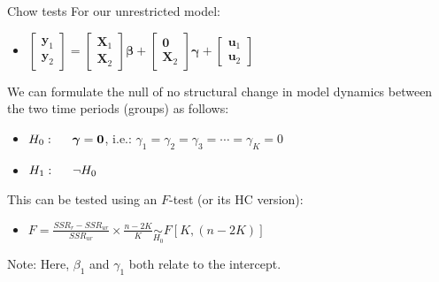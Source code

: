 \documentclass{beamer}
\begin{document}
\begin{frame}{Chow tests}
For  our unrestricted model:\\
\medskip
\begin{itemize}
\item 
$ \begin{bmatrix} \bm{y}_1 \\ \bm{y}_2 \end{bmatrix} = 
\begin{bmatrix} \bm{X}_1 \\ \bm{X}_2 \end{bmatrix} \bm{\beta} +
\begin{bmatrix} \bm{0} \\ \bm{X}_2 \end{bmatrix} \bm{\gamma} +
\begin{bmatrix} \bm{u}_1 \\ \bm{u}_2 \end{bmatrix}$ \\
\vspace{0.3cm}
\end{itemize}
\medskip
We can formulate the null of no structural change in model dynamics between the two time periods (groups) as follows:
\begin{itemize}
\item 
$ H_0: \hspace{0.5cm} \bm{\gamma}= \bm{0}$, i.e.: 
$\gamma_1 = \gamma_2 = \gamma_3= \cdots = \gamma_K=0 $
\item 
$ H_1: \hspace{0.5cm} \neg H_0$ 
\end{itemize}
\medskip
This can be tested using an $F$-test (or its HC version): 
\vspace{0.3cm}
\begin{itemize}
\item 
$ F = \frac{\textit{SSR}_r - \textit{SSR}_{\textit{ur}}}{\textit{SSR}_{\textit{ur}}} \times \frac{n-2K}{K} \underset{H_0}{\sim } F[K, (n-2K)] $ 
\end{itemize}
\medskip
\small{Note: Here, $\beta_1$ and $\gamma_1$ both relate to the intercept.}
\end{frame}
\end{document}
